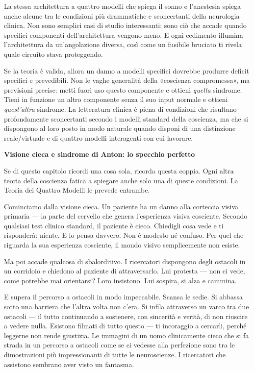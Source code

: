 \documentclass[11pt, twoside, openright]{book}
\begin{document}
La stessa architettura a quattro modelli che spiega il sonno e l'anestesia spiega anche alcune tra le condizioni più drammatiche e sconcertanti della neurologia clinica. Non sono semplici casi di studio interessanti: sono ciò che accade quando specifici componenti dell'architettura vengono meno. E ogni cedimento illumina l'architettura da un'angolazione diversa, così come un fusibile bruciato ti rivela quale circuito stava proteggendo.

Se la teoria è valida, allora un danno a modelli specifici dovrebbe produrre deficit specifici e prevedibili. Non le vaghe generalità della «coscienza compromessa», ma previsioni precise: metti fuori uso questo componente e ottieni \textit{quella} sindrome. Tieni in funzione un altro componente senza il suo input normale e ottieni \textit{quest'altra} sindrome. La letteratura clinica è piena di condizioni che risultano profondamente sconcertanti secondo i modelli standard della coscienza, ma che si dispongono al loro posto in modo naturale quando disponi di una distinzione reale/\allowbreak{}virtuale e di quattro modelli interagenti con cui lavorare.

\textbf{Visione cieca e sindrome di Anton: lo specchio perfetto}

Se di questo capitolo ricordi una cosa sola, ricorda questa coppia. Ogni altra teoria della coscienza fatica a spiegare anche solo una di queste condizioni. La Teoria dei Quattro Modelli le prevede entrambe.

Cominciamo dalla visione cieca. Un paziente ha un danno alla corteccia visiva primaria --- la parte del cervello che genera l'esperienza visiva cosciente. Secondo qualsiasi test clinico standard, il paziente è cieco. Chiedigli cosa vede e ti risponderà: niente. E lo pensa davvero. Non è modesto né confuso. Per quel che riguarda la sua esperienza cosciente, il mondo visivo semplicemente non esiste.

Ma poi accade qualcosa di sbalorditivo. I ricercatori dispongono degli ostacoli in un corridoio e chiedono al paziente di attraversarlo. Lui protesta --- non ci vede, come potrebbe mai orientarsi? Loro insistono. Lui sospira, si alza e cammina.

E supera il percorso a ostacoli in modo impeccabile. Scansa le sedie. Si abbassa sotto una barriera che l'altra volta non c'era. Si infila attraverso un varco tra due ostacoli --- il tutto continuando a sostenere, con sincerità e verità, di non riuscire a vedere nulla. Esistono filmati di tutto questo --- ti incoraggio a cercarli, perché leggerne non rende giustizia. Le immagini di un uomo clinicamente cieco che si fa strada in un percorso a ostacoli come se ci vedesse alla perfezione sono tra le dimostrazioni più impressionanti di tutte le neuroscienze. I ricercatori che assistono sembrano aver visto un fantasma.
\end{document}
